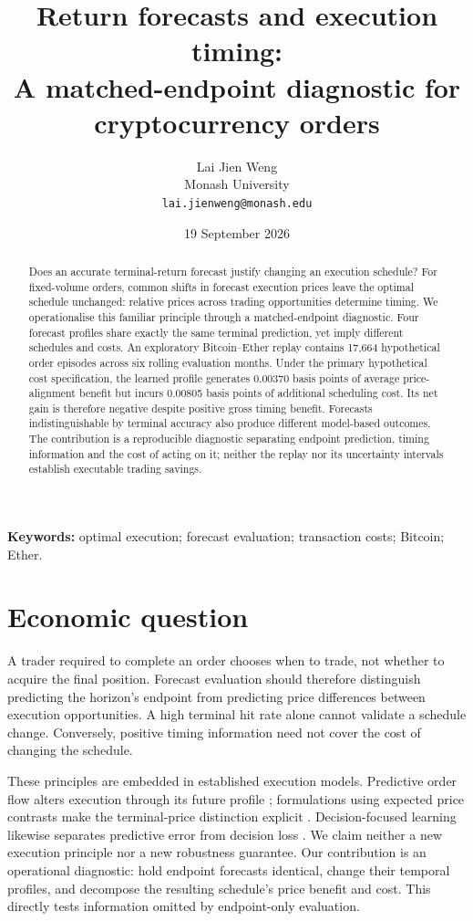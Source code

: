 \documentclass[11pt]{article}
\title{Return forecasts and execution timing:\\A matched-endpoint diagnostic for cryptocurrency orders}
\author{Lai Jien Weng\\Monash University\\\texttt{lai.jienweng@monash.edu}}
\date{19 September 2026}
\begin{document}
\maketitle
\begin{abstract}
Does an accurate terminal-return forecast justify changing an execution schedule? For fixed-volume orders, common shifts in forecast execution prices leave the optimal schedule unchanged: relative prices across trading opportunities determine timing. We operationalise this familiar principle through a matched-endpoint diagnostic. Four forecast profiles share exactly the same terminal prediction, yet imply different schedules and costs. An exploratory Bitcoin--Ether replay contains 17,664 hypothetical order episodes across six rolling evaluation months. Under the primary hypothetical cost specification, the learned profile generates 0.00370 basis points of average price-alignment benefit but incurs 0.00805 basis points of additional scheduling cost. Its net gain is therefore negative despite positive gross timing benefit. Forecasts indistinguishable by terminal accuracy also produce different model-based outcomes. The contribution is a reproducible diagnostic separating endpoint prediction, timing information and the cost of acting on it; neither the replay nor its uncertainty intervals establish executable trading savings.
\end{abstract}
\noindent\textbf{Keywords:} optimal execution; forecast evaluation; transaction costs; Bitcoin; Ether.

\section{Economic question}
A trader required to complete an order chooses when to trade, not whether to acquire the final position. Forecast evaluation should therefore distinguish predicting the horizon's endpoint from predicting price differences between execution opportunities. A high terminal hit rate alone cannot validate a schedule change. Conversely, positive timing information need not cover the cost of changing the schedule.

These principles are embedded in established execution models. Predictive order flow alters execution through its future profile \citep{cartea2016,lehalle2019}; formulations using expected price contrasts make the terminal-price distinction explicit \citep{forde2022,abijaber2025}. Decision-focused learning likewise separates predictive error from decision loss \citep{elmachtoub2022}. We claim neither a new execution principle nor a new robustness guarantee. Our contribution is an operational diagnostic: hold endpoint forecasts identical, change their temporal profiles, and decompose the resulting schedule's price benefit and cost. This directly tests information omitted by endpoint-only evaluation.
\end{document}
